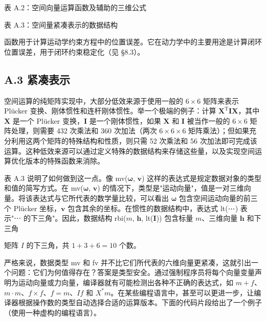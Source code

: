 \documentclass[10pt,a4paper]{book}
\theoremstyle{thmstyle} %
\theoremstyle{defstyle} %
\theoremstyle{prostyle} %
\begin{document}
表 A.2：空间向量运算函数及辅助的三维公式





表 A.3：空间量紧凑表示的数据结构





函数用于计算运动学约束方程中的位置误差。它在动力学中的主要用途是计算闭环位置误差，用于闭环约束稳定化（见 §8.3）。



\subsection{A.3 紧凑表示}





空间运算的纯矩阵实现中，大部分低效来源于使用一般的 $6 \times 6$ 矩阵来表示 Plücker 变换、刚体惯性和连杆刚体惯性。举一个极端的例子：计算 $\mathbf{X}^{\mathrm{T}} \mathbf{I} \mathbf{X}$，其中 $\mathbf{X}$ 是一个 Plücker 变换，$\mathbf{I}$ 是一个刚体惯性，如果 $\mathbf{X}$ 和 $\mathbf{I}$ 被当作一般的 $6 \times 6$ 矩阵处理，则需要 432 次乘法和 360 次加法（两次 $6 \times 6 \times 6$ 矩阵乘法）；但如果充分利用这两个矩阵的特殊结构和性质，则只需 52 次乘法和 56 次加法即可完成该运算。这种低效来源可以通过定义特殊的数据结构来存储这些量，以及实现空间运算优化版本的特殊函数来消除。



表 A.3 说明了如何做到这一点。像 mv($\boldsymbol{\omega}$, $\boldsymbol{v}$) 这样的表达式是规定数据对象的类型和值的简写方式。在 mv($\boldsymbol{\omega}$, $\boldsymbol{v}$) 的情况下，类型是"运动向量"，值是一对三维向量。将该表达式与它所代表的数学量比较，可以看出 $\boldsymbol{\omega}$ 包含空间运动向量的前三个 Plücker 坐标，$\boldsymbol{v}$ 包含其余的坐标。在惯性的数据结构中，表达式 lt(⋯) 表示"⋯ 的下三角"。因此，数据结构 rbi($m$, $\boldsymbol{h}$, lt($\boldsymbol{I}$)) 包含标量 $m$、三维向量 $\boldsymbol{h}$ 和下三角



矩阵 $I$ 的下三角，共 $1 + 3 + 6 = 10$ 个数。



严格来说，数据类型 mv 和 fv 并不比它们所代表的六维向量更紧凑，这就引出一个问题：它们为何值得存在？答案是类型安全。通过强制程序员将每个向量变量声明为运动向量或力向量，编译器就有可能检测出各种不正确的表达式，如 $m + f$、$m \cdot m$、$f \times f$、$f = m$、$If$ 和 $X^*m$。在某些编程语言中，甚至可以更进一步，让编译器根据操作数的类型自动选择合适的运算版本。下面的代码片段给出了一个例子（使用一种虚构的编程语言）。
\end{document}
